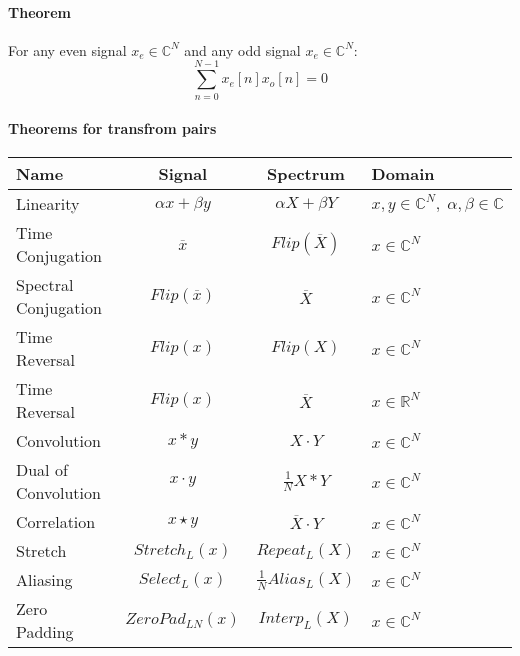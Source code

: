 \paragraph{Theorem}
For any even signal $x_e \in \mathbb{C}^N$ and any odd signal $x_e \in \mathbb{C}^N$:
\begin{equation}
  \sum_{n=0}^{N-1} x_e[n] x_o[n] = 0
\end{equation}

\paragraph{Theorems for transfrom pairs}

\begin{center}
\begin{tabular}{|l|c|c|l|}
 \hline
 Name                 & Signal                 & Spectrum                & Domain \\
 \hline
 Linearity            &  $ \alpha x + \beta y$ & $\alpha X + \beta Y    $   & $x,y \in \mathbb{C}^N, \; \alpha, \beta \in \mathbb{C}$ \\
 Time Conjugation     &  $ \overline{x}      $ & $ Flip(\overline{X})   $   & $x \in \mathbb{C}^N$                                    \\ 
 Spectral Conjugation &  $ Flip(\overline{x})$ & $      \overline{X}    $   & $x \in \mathbb{C}^N$                                    \\  
 Time Reversal        &  $ Flip(x)$            & $           Flip(X)    $   & $x \in \mathbb{C}^N$                                    \\ 
 Time Reversal        &  $ Flip(x)$            & $      \overline{X}    $   & $x \in \mathbb{R}^N$                                    \\  
 Convolution          &  $ x * y             $ & $     X \cdot Y        $   & $x \in \mathbb{C}^N$                                    \\   
 Dual of Convolution  &  $ x \cdot y         $ & $\frac{1}{N} X * Y     $   & $x \in \mathbb{C}^N$                                    \\  
 Correlation          &  $ x \star y         $ & $\overline{X} \cdot Y  $   & $x \in \mathbb{C}^N$                                    \\   
 Stretch              &  $ Stretch_L(x)      $ & $Repeat_L(X)           $   & $x \in \mathbb{C}^N$                                    \\       
 Aliasing             &  $ Select_L(x)       $ & $\frac{1}{N} Alias_L(X)$   & $x \in \mathbb{C}^N$                                    \\       
 Zero Padding         &  $ ZeroPad_{LN}(x)   $ & $           Interp_L(X)$   & $x \in \mathbb{C}^N$                                    \\     
 \hline
\end{tabular}
\end{center}

